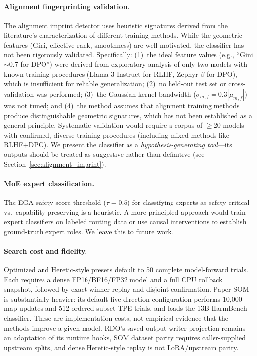 \documentclass[11pt]{article}
\begin{document}
\paragraph{Alignment fingerprinting validation.}
The alignment imprint detector uses heuristic signatures derived from the literature's characterization of different training methods. While the geometric features (Gini, effective rank, smoothness) are well-motivated, the classifier has not been rigorously validated. Specifically: (1)~the ideal feature values (e.g., ``Gini $\sim 0.7$ for DPO'') were derived from exploratory analysis of only two models with known training procedures (Llama-3-Instruct for RLHF, Zephyr-$\beta$ for DPO), which is insufficient for reliable generalization; (2)~no held-out test set or cross-validation was performed; (3)~the Gaussian kernel bandwidth ($\sigma_{m,f} = 0.3|\mu_{m,f}|$) was not tuned; and (4)~the method assumes that alignment training methods produce distinguishable geometric signatures, which has not been established as a general principle. Systematic validation would require a corpus of $\geq$20 models with confirmed, diverse training procedures (including mixed methods like RLHF+DPO). We present the classifier as a \emph{hypothesis-generating tool}---its outputs should be treated as suggestive rather than definitive (see Section~\ref{sec:alignment_imprint}).

\paragraph{MoE expert classification.}
The EGA safety score threshold ($\tau = 0.5$) for classifying experts as safety-critical vs.\ capability-preserving is a heuristic. A more principled approach would train expert classifiers on labeled routing data or use causal interventions to establish ground-truth expert roles. We leave this to future work.

\paragraph{Search cost and fidelity.}
Optimized and Heretic-style presets default to 50 complete model-forward trials. Each requires a dense FP16/BF16/FP32 model and a full CPU rollback snapshot, followed by exact winner replay and disjoint confirmation. Paper SOM is substantially heavier: its default five-direction configuration performs 10,000 map updates and 512 ordered-subset TPE trials, and loads the 13B HarmBench classifier. These are implementation costs, not empirical evidence that the methods improve a given model. RDO's saved output-writer projection remains an adaptation of its runtime hooks, SOM dataset parity requires caller-supplied upstream splits, and dense Heretic-style replay is not LoRA/upstream parity.
\end{document}

